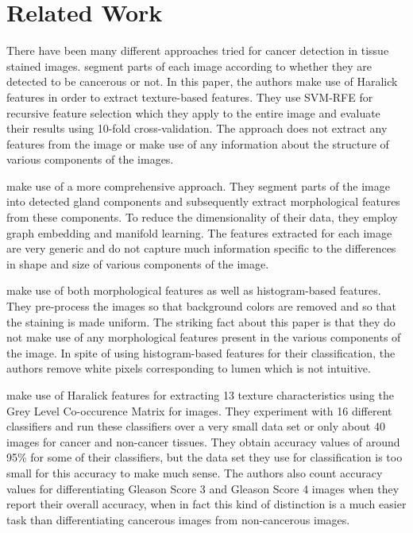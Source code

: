 \section{Related Work}
There have been many different approaches tried for cancer detection in tissue stained images. \cite{automatic} segment parts of each image according to whether they are detected to be cancerous or not. In this paper, the authors make use of Haralick features \cite{haralick1973textural} in order to extract texture-based features. They use SVM-RFE for recursive feature selection which they apply to the entire image and evaluate their results using 10-fold cross-validation. The approach does not extract any features from the image or make use of any information about the structure of various components of the images. 

\cite{naik2007gland} make use of a more comprehensive approach. They segment parts of the image into detected gland components and subsequently extract morphological features from these components. To reduce the dimensionality of their data, they employ graph embedding and manifold learning. The features extracted for each image are very generic and do not capture much information specific to the differences in shape and size of various components of the image.

\cite{tabesh2007multifeature} make use of both morphological features as well as histogram-based features. They pre-process the images so that background colors are removed and so that the staining is made uniform. The striking fact about this paper is that they do not make use of any morphological features present in the various components of the image. In spite of using histogram-based features for their classification, the authors remove white pixels corresponding to lumen which is not intuitive. 

\cite{alexandratou2010evaluation} make use of Haralick features for extracting 13 texture characteristics using the Grey Level Co-occurence Matrix for images. They experiment with 16 different classifiers and run these classifiers over a very small data set or only about 40 images for cancer and non-cancer tissues. They obtain accuracy values of around 95\% for some of their classifiers, but the data set they use for classification is too small for this accuracy to make much sense. The authors also count accuracy values for differentiating Gleason Score 3 and Gleason Score 4 images when they report their overall accuracy, when in fact this kind of distinction is a much easier task than differentiating cancerous images from non-cancerous images.

